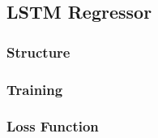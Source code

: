 \subsection{LSTM Regressor}
\subsubsection{Structure}

\subsubsection{Training}

\subsubsection{Loss Function}
